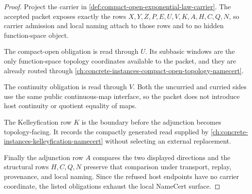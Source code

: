 \begin{proof}
Project the carrier in \autoref{def:compact-open-exponential-law-carrier}. The accepted packet exposes exactly the rows $X,Y,Z,P,E,U,V,K,A,H,C,Q,N$, so carrier admission and local naming attach to those rows and to no hidden function-space object.

The compact-open obligation is read through $U$. Its subbasic windows are the only function-space topology coordinates available to the packet, and they are already routed through \autoref{ch:concrete-instances-compact-open-topology-namecert}.

The continuity obligation is read through $V$. Both the uncurried and curried sides use the same public continuous-map interface, so the packet does not introduce host continuity or quotient equality of maps.

The Kelleyfication row $K$ is the boundary before the adjunction becomes topology-facing. It records the compactly generated read supplied by \autoref{ch:concrete-instances-kelleyfication-namecert} without selecting an external replacement.

Finally the adjunction row $A$ compares the two displayed directions and the structural rows $H,C,Q,N$ preserve that comparison under transport, replay, provenance, and local naming. Since the refused host endpoints have no carrier coordinate, the listed obligations exhaust the local NameCert surface.
\end{proof}

